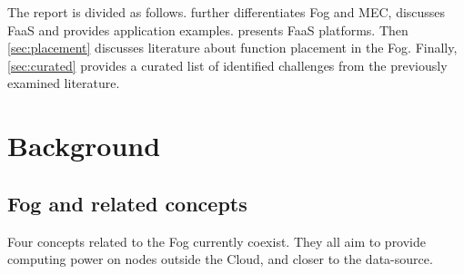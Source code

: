 \documentclass[11pt]{sdm}
\begin{document}
The report is divided as follows.  further differentiates Fog and \gls{MEC}, discusses \gls{FaaS} and provides application examples.  presents \gls{FaaS} platforms. Then \cref{sec:placement} discusses literature about function placement in the Fog. Finally, \cref{sec:curated} provides a curated list of identified challenges from the previously examined literature.

\section{Background}
\label{sec:background}

\subsection{Fog and related concepts}

Four concepts related to the Fog currently coexist. They all aim to provide computing power on nodes outside the Cloud, and closer to the data-source.
\end{document}

